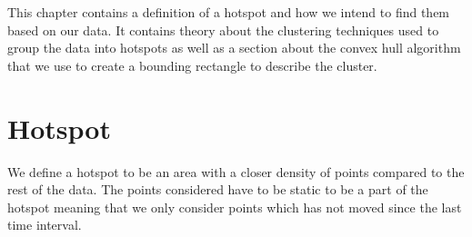 This chapter contains a definition of a hotspot and how we intend to find them based on our data.
It contains theory about the clustering techniques used to group the data into hotspots as well as a section about the convex hull algorithm that we use to create a bounding rectangle to describe the cluster.

\section{Hotspot}\label{hotspot}
We define a hotspot to be an area with a closer density of points compared to the rest of the data.
The points considered have to be static to be a part of the hotspot meaning that we only consider points which has not moved since the last time interval.